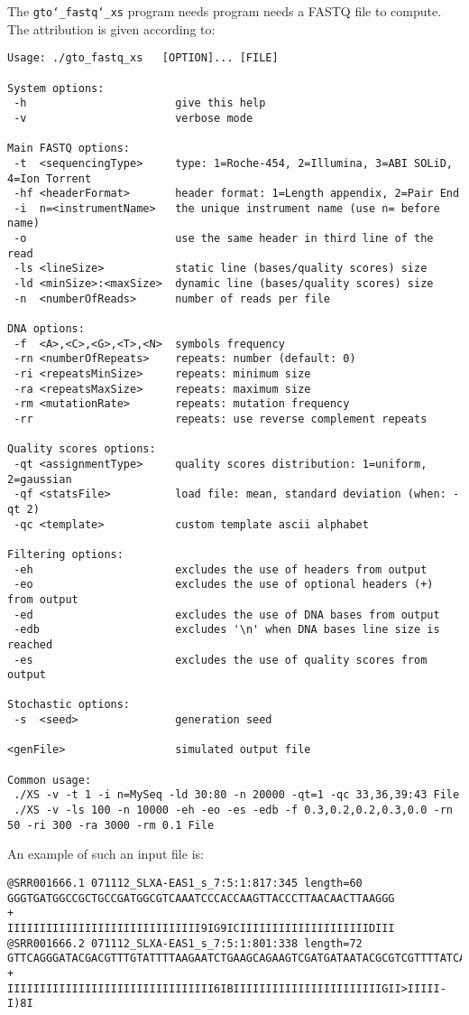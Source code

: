 The \texttt{gto\char`_fastq\char`_xs} program needs program needs a FASTQ file to compute.\\
The attribution is given according to:
\begin{lstlisting}
Usage: ./gto_fastq_xs   [OPTION]... [FILE] 

System options:
 -h                       give this help
 -v                       verbose mode

Main FASTQ options:
 -t  <sequencingType>     type: 1=Roche-454, 2=Illumina, 3=ABI SOLiD, 4=Ion Torrent
 -hf <headerFormat>       header format: 1=Length appendix, 2=Pair End
 -i  n=<instrumentName>   the unique instrument name (use n= before name)
 -o                       use the same header in third line of the read
 -ls <lineSize>           static line (bases/quality scores) size
 -ld <minSize>:<maxSize>  dynamic line (bases/quality scores) size
 -n  <numberOfReads>      number of reads per file

DNA options:
 -f  <A>,<C>,<G>,<T>,<N>  symbols frequency
 -rn <numberOfRepeats>    repeats: number (default: 0)
 -ri <repeatsMinSize>     repeats: minimum size
 -ra <repeatsMaxSize>     repeats: maximum size
 -rm <mutationRate>       repeats: mutation frequency
 -rr                      repeats: use reverse complement repeats

Quality scores options:
 -qt <assignmentType>     quality scores distribution: 1=uniform, 2=gaussian
 -qf <statsFile>          load file: mean, standard deviation (when: -qt 2)
 -qc <template>           custom template ascii alphabet

Filtering options:
 -eh                      excludes the use of headers from output
 -eo                      excludes the use of optional headers (+) from output
 -ed                      excludes the use of DNA bases from output
 -edb                     excludes '\n' when DNA bases line size is reached
 -es                      excludes the use of quality scores from output

Stochastic options:
 -s  <seed>               generation seed

<genFile>                 simulated output file

Common usage:
 ./XS -v -t 1 -i n=MySeq -ld 30:80 -n 20000 -qt=1 -qc 33,36,39:43 File
 ./XS -v -ls 100 -n 10000 -eh -eo -es -edb -f 0.3,0.2,0.2,0.3,0.0 -rn 50 -ri 300 -ra 3000 -rm 0.1 File
\end{lstlisting}
An example of such an input file is:
\begin{lstlisting}
@SRR001666.1 071112_SLXA-EAS1_s_7:5:1:817:345 length=60
GGGTGATGGCCGCTGCCGATGGCGTCAAATCCCACCAAGTTACCCTTAACAACTTAAGGG
+
IIIIIIIIIIIIIIIIIIIIIIIIIIIIII9IG9ICIIIIIIIIIIIIIIIIIIIIDIII
@SRR001666.2 071112_SLXA-EAS1_s_7:5:1:801:338 length=72
GTTCAGGGATACGACGTTTGTATTTTAAGAATCTGAAGCAGAAGTCGATGATAATACGCGTCGTTTTATCAT
+
IIIIIIIIIIIIIIIIIIIIIIIIIIIIIIII6IBIIIIIIIIIIIIIIIIIIIIIIIGII>IIIII-I)8I
\end{lstlisting}

